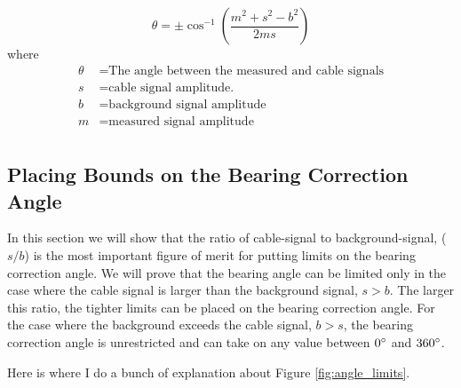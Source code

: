\documentclass[paper=a4, fontsize=11pt]{scrartcl}
\numberwithin{equation}{section}		%
\numberwithin{figure}{section}			%
\numberwithin{table}{section}				%
\begin{document}
\begin{appendices}
\begin{equation} \label{eq:theta_solution}
\theta = \pm \cos^{-1}\left(\frac{m^2 + s^2 - b^2}{2ms}\right)
\end{equation}
where
\begin{align*}
        \theta &= \text{The angle between the measured and cable signals}\\
        s &= \text{cable signal amplitude.}\\
        b &= \text{background signal amplitude} \\
        m &= \text{measured signal amplitude} \\
\end{align*}


\subsection{Placing Bounds on the Bearing Correction Angle}
In this section we will show that the ratio of cable-signal to background-signal, ($s/b$) is the most important figure of merit for putting limits on the bearing correction angle.  We will prove that the bearing angle can be limited only in the case where the cable signal is larger than the background signal, $s > b$.  The larger this ratio, the tighter limits can be placed on the bearing correction angle.  For the case where the background exceeds the cable signal, $b > s$, the bearing correction angle is unrestricted and can take on any value between $0\degree$ and $360\degree$.


Here is where I do a bunch of explanation about Figure \ref{fig:angle_limits}.



\end{appendices}
\end{document}

